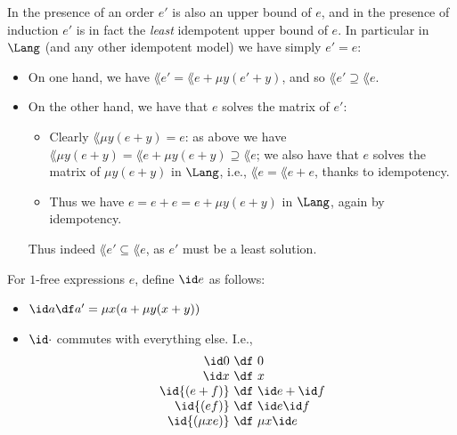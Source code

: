 In the presence of an order $e'$ is also an upper bound of $e$, and in the presence of induction $e'$ is in fact the \emph{least} idempotent upper bound of $e$.
In particular in $\Lang $ (and any other idempotent model) we have simply $e'=e$:
\begin{itemize}
    \item On one hand, we have $\lang {e'} = \lang{e + \mu y (e'+y)}$, and so $\lang {e'} \supseteq \lang e$.
    \item On the other hand, we have that $e$ solves the matrix of $e'$:
    \begin{itemize}
        \item Clearly $\lang {\mu y (e+y)} = e$: as above we have $\lang {\mu y (e+y)} = \lang{e + \mu y (e+y)} \supseteq \lang e$; we also have that $e$ solves the matrix of $\mu y (e+y)$ in $\Lang$, i.e., $\lang e = \lang {e+e}$, thanks to idempotency.
        \item Thus we have $e = e + e = e + \mu y (e+y)$ in $\Lang$, again by idempotency.
    \end{itemize}
    Thus indeed $\lang {e'}\subseteq \lang e$, as $e'$ must be a least solution.
\end{itemize}

\begin{definition}
    For $1$-free expressions $e$, define $\id e $ as follows:
\begin{itemize}
    \item $\id a \df a' = \mu x (a + \mu y (x+y))$
    \item $\id \cdot $ commutes with everything else. I.e.,
    \[
    \begin{array}{r@{\ \df\ }l}
         \id 0 & 0 \\
         \id x & x \\
         \id {(e+f)} & \id e + \id f \\
         \id {(ef)} & \id e \id f \\
         \id{(\mu x e)} & \mu x \id e
    \end{array}
    \]
\end{itemize}
\end{definition}

